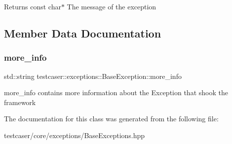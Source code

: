 \begin{DoxyReturn}{Returns}
const char$\ast$ The message of the exception 
\end{DoxyReturn}


\subsection{Member Data Documentation}
\mbox{\label{classtestcaser_1_1exceptions_1_1BaseException_abfc26d4451ae832886c32ad2e283104e}} 
\subsubsection{\texorpdfstring{more\_info}{more\_info}}
{\footnotesize\ttfamily std\+::string testcaser\+::exceptions\+::\+Base\+Exception\+::more\+\_\+info\hspace{0.3cm}{\ttfamily [protected]}}



more\+\_\+info contains more information about the Exception that shook the framework 



The documentation for this class was generated from the following file\+:\begin{DoxyCompactItemize}
\item 
testcaser/core/exceptions/Base\+Exceptions.\+hpp\end{DoxyCompactItemize}
